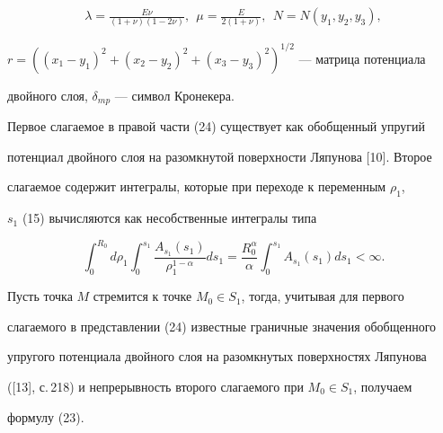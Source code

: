 \begin{pf}
\begin{gather*}
\lambda=\frac{E\nu}{(1+\nu)(1-2\nu)},\ \  


\mu=\frac{E}{2(1+\nu)},\ \ N=N(y_1,y_2,y_3), 


\end{gather*} 


$r=((x_1-y_1)^2+(x_2-y_2)^2+(x_3-y_3)^2)^{1/2}$ --- матрица потенциала 


двойного слоя, $\delta_{mp}$ --- символ Кронекера. 


 


Первое слагаемое в правой части (24) существует как обобщенный упругий  


потенциал двойного слоя на разомкнутой поверхности Ляпунова [10]. Второе  


слагаемое содержит интегралы, которые при переходе к переменным $\rho_1$, 


$s_1$ (15) вычисляются как несобственные интегралы типа 


$$ 


\int^{R_0}_0d\rho_1\int^{s_1}_0\frac{A_{s_1}(s_1)}{\rho^{1-\alpha}_1} 


ds_1=\frac{R^\alpha_0}{\alpha}\int^{s_1}_0 A_{s_1}(s_1)ds_1<\infty. 


$$ 


 


Пусть точка $M$ стремится к точке $M_0\in S_1$, тогда, учитывая для первого  


слагаемого в представлении (24) известные граничные значения обобщенного  


упругого потенциала двойного слоя на разомкнутых поверхностях Ляпунова  


([13], с.\,218) и непрерывность второго слагаемого при $M_0\in S_1$, получаем 


формулу (23). 


\end{pf} 


 


